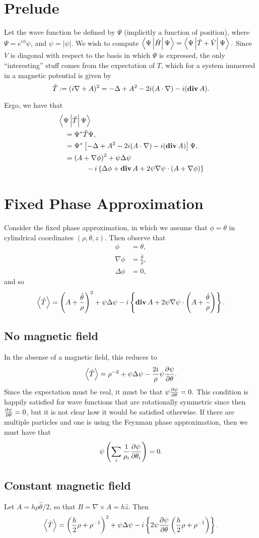 \documentclass[twocolumn,showpacs,preprintnumbers,amsmath,amssymb,nofootinbib,pra,floatfix]{revtex4}
\newcommand{\Div}{\text{\textbf{div}}\,}
\begin{document}
\section{Prelude}

Let the wave function be defined by $\Psi$ (implicitly a function of position), where $\Psi=e^{i\phi} \psi$, and $\psi=|\psi|$.  We wish to compute $\left<\Psi\left|\hat H\right|\Psi\right> = \left<\Psi\left|\hat T+\hat V\right|\Psi\right>.$  Since $V$ is diagonal with respect to the basis in which $\Psi$ is expressed, the only ``interesting'' stuff comes from the expectation of $T$, which for a system immersed in a magnetic potential is given by $$\hat T:=(i\nabla + A)^2 = -\Delta + A^2 - 2i(A\cdot \nabla) - i(\Div A).$$

Ergo, we have that
$$
\begin{aligned}
&\coip{\Psi}{\hat T}{\Psi} \\
&\quad = \Psi^* \hat T \Psi, \\
&\quad = \Psi^* \left[-\Delta + A^2 - 2i(A\cdot \nabla) - i(\Div A)\right] \Psi, \\
&\quad = \paren{A+\nabla \phi}^2 + \psi\Delta \psi \\ &\qquad\qquad - i\left\{\Delta \phi + \Div A + 2\psi\nabla\psi \cdot (A+\nabla\phi)\right\}
\end{aligned}
$$

\section{Fixed Phase Approximation}

Consider the fixed phase approximation, in which we assume that $\phi = \theta$ in cylindrical coordinates $(\rho,\theta,z)$.  Then observe that
$$\begin{aligned}
\phi &= \theta,\\
\nabla \phi &= \frac{\hat\theta}{\rho},\\
\Delta \phi &= 0,
\end{aligned}
$$ and so $$\exp{\hat T} = \paren{A+\frac{\hat\theta}{\rho}}^2 + \psi\Delta\psi - i\left\{\Div A + 2\psi\nabla\psi \cdot \paren{A+\frac{\hat\theta}{\rho}}\right\}.$$  


\subsection{No magnetic field}
In the absense of a magnetic field, this reduces to  $$\left<\hat T\right> =\rho^{-2} + \psi\Delta\psi - \frac{2i}{\rho}\psi\frac{\partial \psi}{\partial \theta}.$$ Since the expectation must be real, it must be that $\psi \frac{\partial \psi}{\partial \theta}=0.$  This condition is happily satisfied for wave functions that are rotationally symmetric since then $\frac{\partial \psi}{\partial \theta}=0$, but it is not clear how it would be satisfied otherwise.  If there are multiple particles and one is using the Feynman phase approximation, then we must have that $$\psi \left(\sum_i \frac{1}{\rho_i}\frac{\partial \psi}{\partial \theta_i}\right) = 0.$$

\subsection{Constant magnetic field}

Let $A=h\rho \hat\theta/2$, so that $B=\nabla\times A = h\hat z$.  Then
$$\left<\hat T\right> =  \left(\frac{h}{2}\rho+\rho^{-1}\right)^2 + \psi\Delta\psi - i\left\{2\psi\frac{\partial \psi}{\partial \theta} \left(\frac{h}{2}\rho + \rho^{-1}\right)\right\}.$$  
\end{document}
